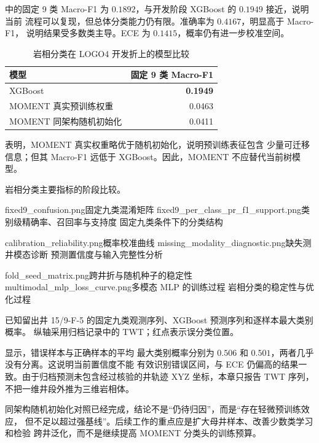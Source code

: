 中的固定 9 类 Macro-F1 为 $0.1892$，与开发阶段
XGBoost 的 $0.1949$ 接近，说明当前
流程可以复现，但总体分类能力仍有限。准确率为 $0.4167$，明显高于 Macro-F1，
说明结果受多数类主导。ECE 为 $0.1415$，概率仍有进一步校准空间。

\begin{table}[htbp]
  \centering
  \caption{岩相分类在 LOGO4 开发折上的模型比较}
  \label{tab:litho-dev}
  \begin{tabular}{lr}
    \toprule
    模型 & 固定 9 类 Macro-F1 \\
    \midrule
    XGBoost & \textbf{0.1949} \\
    MOMENT 真实预训练权重 & 0.0463 \\
    MOMENT 同架构随机初始化 & 0.0411 \\
    \bottomrule
  \end{tabular}
\end{table}

表明，MOMENT 真实权重略优于随机初始化，说明预训练表征包含
少量可迁移信息；但其 Macro-F1 远低于 XGBoost。因此，MOMENT 不应替代当前树模型。

  {岩相分类主要指标的阶段比较。}

  {fixed9_confusion.png}{固定九类混淆矩阵}
  {fixed9_per_class_pr_f1_support.png}{类别级精确率、召回率与支持度}
  {固定九类条件下的分类结构}

  {calibration_reliability.png}{概率校准曲线}
  {missing_modality_diagnostic.png}{缺失测井模态诊断}
  {预测置信度与输入完整性分析}

  {fold_seed_matrix.png}{跨井折与随机种子的稳定性}
  {multimodal_mlp_loss_curve.png}{多模态 MLP 的训练过程}
  {岩相分类的稳定性与优化过程}

  {已知留出井 15/9-F-5 的固定九类观测序列、XGBoost 预测序列和逐样本最大类别概率。
  纵轴采用归档记录中的 TWT；红点表示误分类位置。}

显示，错误样本与正确样本的平均
最大类别概率分别为 $0.506$ 和 $0.501$，两者几乎没有分离。这说明当前置信度不能
有效识别错误区间，与 ECE 仍偏高的结果一致。由于归档预测未包含经过核验的井轨迹
XYZ 坐标，本章只报告 TWT 序列，不把一维井段外推为三维岩相体。

同架构随机初始化对照已经完成，结论不是“仍待归因”，而是“存在轻微预训练效应，
但不足以超过强基线”。后续工作的重点应是扩大母井样本、改善少数类学习和检验
跨井泛化，而不是继续提高 MOMENT 分类头的训练预算。

\FloatBarrier
